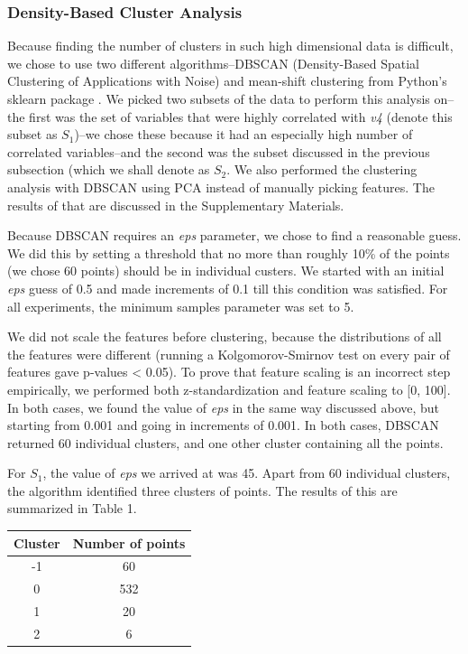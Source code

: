 \documentclass[12pt,a4paper,twocolumn]{article}
\begin{document}
	\subsubsection{Density-Based Cluster Analysis}
	Because finding the number of clusters in such high dimensional data is difficult, we chose to use two different algorithms--DBSCAN (Density-Based Spatial Clustering of Applications with Noise)\cite{ester1996density} and mean-shift clustering \cite{comaniciu2002mean} from Python's sklearn package \cite{scikit-learn}. We picked two subsets of the data to perform this analysis on--the first was the set of variables that were highly correlated with \textit{v4} (denote this subset as $S_1$)--we chose these because it had an especially high number of correlated variables--and the second was the subset discussed in the previous subsection (which we shall denote as $S_2$. We also performed the clustering analysis with DBSCAN using PCA instead of manually picking features. The results of that are discussed in the Supplementary Materials.
	
	Because DBSCAN requires an \textit{eps} parameter, we chose to find a reasonable guess. We did this by setting a threshold that no more than roughly 10\% of the points (we chose 60 points) should be in individual custers. We started with an initial \textit{eps} guess of 0.5 and made increments of 0.1 till this condition was satisfied. For all experiments, the minimum samples parameter was set to 5.
	
	We did not scale the features before clustering, because the distributions of all the features were different (running a Kolgomorov-Smirnov test on every pair of features gave p-values < 0.05). To prove that feature scaling is an incorrect step empirically, we performed both z-standardization and feature scaling to [0, 100]. In both cases, we found the value of \textit{eps} in the same way discussed above, but starting from 0.001 and going in increments of 0.001. In both cases, DBSCAN returned 60 individual clusters, and one other cluster containing all the points.
	
	For $S_1$, the value of \textit{eps} we arrived at was 45. Apart from 60 individual clusters, the algorithm identified three clusters of points. The results of this are summarized in Table 1. \\
	
	\begin{tabular}{|c|c|}
		\hline 
		\textbf{Cluster} & \textbf{Number of points} \\ 
		\hline 
		-1 & 60 \\ 
		\hline 
		0 & 532 \\ 
		\hline 
		1 & 20 \\ 
		\hline 
		2 & 6 \\ 
		\hline 
	\end{tabular}
	\begingroup
	\endgroup
	\hfill\break
	
\end{document}

